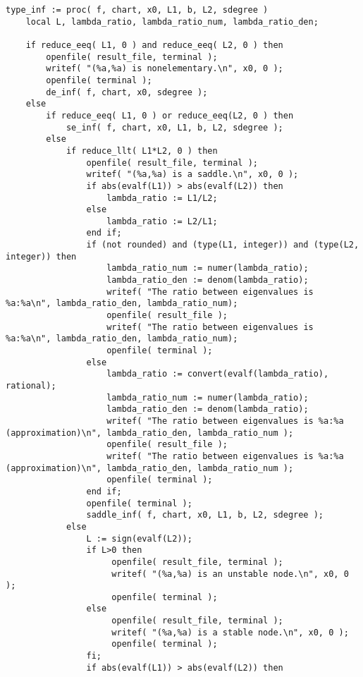 \documentclass[a4paper,10pt]{article}
\begin{document}
\begin{lstlisting}[name=infinity]
type_inf := proc( f, chart, x0, L1, b, L2, sdegree )
    local L, lambda_ratio, lambda_ratio_num, lambda_ratio_den;

    if reduce_eeq( L1, 0 ) and reduce_eeq( L2, 0 ) then
        openfile( result_file, terminal );
        writef( "(%a,%a) is nonelementary.\n", x0, 0 );
        openfile( terminal );
        de_inf( f, chart, x0, sdegree );
    else
        if reduce_eeq( L1, 0 ) or reduce_eeq(L2, 0 ) then
            se_inf( f, chart, x0, L1, b, L2, sdegree );
        else
            if reduce_llt( L1*L2, 0 ) then
                openfile( result_file, terminal );
                writef( "(%a,%a) is a saddle.\n", x0, 0 );
                if abs(evalf(L1)) > abs(evalf(L2)) then
                    lambda_ratio := L1/L2;
                else
                    lambda_ratio := L2/L1;
                end if;
                if (not rounded) and (type(L1, integer)) and (type(L2, integer)) then 
                    lambda_ratio_num := numer(lambda_ratio);
                    lambda_ratio_den := denom(lambda_ratio);
                    writef( "The ratio between eigenvalues is %a:%a\n", lambda_ratio_den, lambda_ratio_num);
                    openfile( result_file );
                    writef( "The ratio between eigenvalues is %a:%a\n", lambda_ratio_den, lambda_ratio_num);
                    openfile( terminal );
                else
                    lambda_ratio := convert(evalf(lambda_ratio), rational);
                    lambda_ratio_num := numer(lambda_ratio);
                    lambda_ratio_den := denom(lambda_ratio);
                    writef( "The ratio between eigenvalues is %a:%a (approximation)\n", lambda_ratio_den, lambda_ratio_num );
                    openfile( result_file );
                    writef( "The ratio between eigenvalues is %a:%a (approximation)\n", lambda_ratio_den, lambda_ratio_num );
                    openfile( terminal );
                end if;
                openfile( terminal );
                saddle_inf( f, chart, x0, L1, b, L2, sdegree );
            else
                L := sign(evalf(L2));
                if L>0 then
                     openfile( result_file, terminal );
                     writef( "(%a,%a) is an unstable node.\n", x0, 0 );
                     openfile( terminal );
                else
                     openfile( result_file, terminal );
                     writef( "(%a,%a) is a stable node.\n", x0, 0 );
                     openfile( terminal );
                fi;
                if abs(evalf(L1)) > abs(evalf(L2)) then

\end{lstlisting}
\end{document}
